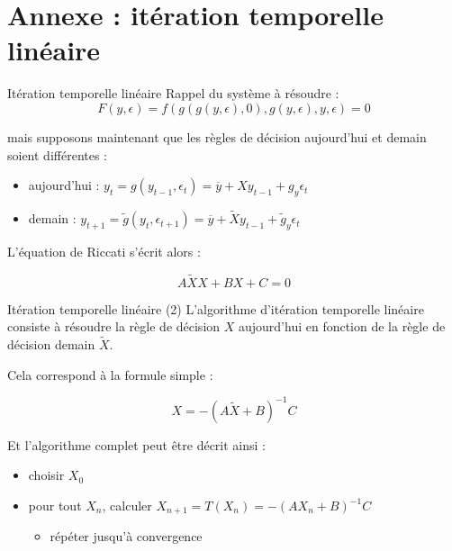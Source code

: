 \documentclass[
  ignorenonframetext,
]{beamer}
\providecommand{\tightlist}{%
  \setlength{\itemsep}{0pt}\setlength{\parskip}{0pt}}
\begin{document}
\section{Annexe : itération temporelle
linéaire}\label{sec:linear_time_iteration}

\begin{frame}{Itération temporelle linéaire}
\label{ituxe9ration-temporelle-linuxe9aire}
Rappel du système à résoudre :
\[F(y,\epsilon) = f(g(g(y,\epsilon),0), g(y,\epsilon), y, \epsilon) = 0\]

mais supposons maintenant que les règles de décision aujourd'hui et
demain soient différentes :

\begin{itemize}
\tightlist
\item
  aujourd'hui :
  \(y_t = g(y_{t-1}, \epsilon_t) = \overline{y} + X y_{t-1} + g_y \epsilon_t\)
\item
  demain :
  \(y_{t+1} = \tilde{g}(y_t, \epsilon_{t+1}) = \overline{y} + \tilde{X} y_{t-1} + \tilde{g}_y \epsilon_t\)
\end{itemize}

L'équation de Riccati s'écrit alors :

\[A \tilde{X} X + B X + C = 0\]
\end{frame}

\begin{frame}{Itération temporelle linéaire (2)}
\label{ituxe9ration-temporelle-linuxe9aire-2}
L'algorithme d'itération temporelle linéaire consiste à résoudre la
règle de décision \(X\) aujourd'hui en fonction de la règle de décision
demain \(\tilde{X}\).

Cela correspond à la formule simple :

\[X = -(A\tilde{X} + B)^{-1} C\]

Et l'algorithme complet peut être décrit ainsi :

\begin{itemize}
\tightlist
\item
  choisir \(X_0\)
\item
  pour tout \(X_n\), calculer \(X_{n+1} = T(X_n) = -(A X_n + B)^{-1} C\)

  \begin{itemize}
  \tightlist
  \item
    répéter jusqu'à convergence
  \end{itemize}
\end{itemize}
\end{frame}
\end{document}
